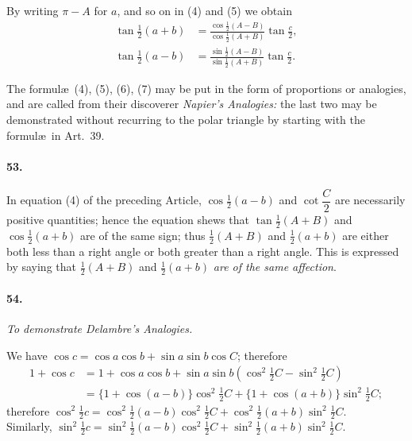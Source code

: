 \documentclass{book}[2004/02/16]
\begin{document}
\begin{mainmatter}
\begin{spacing}{1.3}
By writing $\pi-A$ for $a$, and so on in (4) and (5) we obtain
\begin{align*}
\tan\tfrac{1}{2}(a + b) &=
\frac{\cos\tfrac{1}{2}(A - B)}
     {\cos\tfrac{1}{2}(A + B)}
      \tan\frac{c}{2},			\tag{6}\\[1ex]
\tan\tfrac{1}{2}(a - b) &=
\frac{\sin\tfrac{1}{2}(A - B)}
     {\sin\tfrac{1}{2}(A + B)}
      \tan\frac{c}{2}.			\tag{7}
\end{align*}

The formul\ae\ (4), (5), (6), (7) may be put in the form of proportions
or analogies, and are called from their discoverer \textit{Napier's
Analogies:} the last two may be demonstrated without recurring
to the polar triangle by starting with the formul\ae\ in Art.~39.

\paragraph{53.} In equation (4) of the preceding Article, $\cos\tfrac{1}{2}(a - b)$ and
$\cot\dfrac{C}{2}$ are necessarily positive quantities; hence the equation
shews that $\tan\tfrac{1}{2}(A + B)$ and $\cos\tfrac{1}{2}(a + b)$ are of the same sign;
thus $\tfrac{1}{2}(A+B)$ and $\tfrac{1}{2}(a + b)$ are either both less than a right angle or both greater than a right angle. This is expressed by saying
that $\tfrac{1}{2}(A+B)$ and $\tfrac{1}{2}(a + b)$ \textit{are of the same affection}.

\paragraph{54.} \textit{To demonstrate Delambre's Analogies.}

We have $\cos c = \cos a \cos b + \sin a \sin b \cos C$; therefore
\begin{align*}
1 + \cos c &= 1 + \cos a \cos b +
                  \sin a \sin b (\cos^2\tfrac{1}{2}C -
                                 \sin^2\tfrac{1}{2}C)\\
%
           &= \{1 + \cos (a - b)\} \cos^2\tfrac{1}{2}C +
              \{1 + \cos (a + b)\} \sin^2\tfrac{1}{2}C;
\end{align*}
therefore $\displaystyle%
    \cos^2\tfrac{1}{2}c =
    \cos^2\tfrac{1}{2}(a - b)
    \cos^2\tfrac{1}{2}C +
    \cos^2\tfrac{1}{2}(a + b)
    \sin^2\tfrac{1}{2}C$.
\\
Similarly, $\displaystyle%
    \sin^2\tfrac{1}{2}c =
    \sin^2\tfrac{1}{2}(a - b)
    \cos^2\tfrac{1}{2}C +
    \sin^2\tfrac{1}{2}(a + b)
    \sin^2\tfrac{1}{2}C$.


\end{spacing}
\end{mainmatter}
\end{document}
